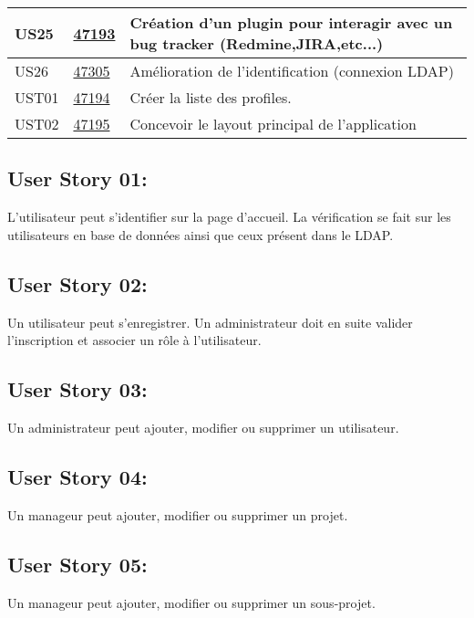 \begin{center}
\begin{tabular}{|l|p{1.5cm}|p{14cm}|}
        \hline
US25	&	\href{https://redmine-projets.smile.fr/issues/47193}{47193}	&	Création d'un plugin pour interagir avec un bug tracker (Redmine,JIRA,etc...)	                \\
        \hline
US26	&	\href{https://redmine-projets.smile.fr/issues/47305}{47305}	&	Amélioration de l'identification (connexion LDAP)	                                            \\
        \hline
UST01	&	\href{https://redmine-projets.smile.fr/issues/47194}{47194}	&	Créer la liste des profiles.	                                                                \\
        \hline
UST02	&	\href{https://redmine-projets.smile.fr/issues/47195}{47195}	&	Concevoir le layout principal de l'application	                                                \\
        \hline
    \end{tabular}
\end{center}


	

	\subsection{User Story 01:}
	L'utilisateur peut s'identifier sur la page d'accueil. La vérification se fait sur les utilisateurs en base de données ainsi que ceux
	présent dans le LDAP.
	

	\subsection{User Story 02:}
	Un utilisateur peut s'enregistrer. Un administrateur doit en suite valider l'inscription et associer un rôle à l'utilisateur.
	
	\subsection{User Story 03:}
	Un administrateur peut ajouter, modifier ou supprimer un utilisateur.
	
	\subsection{User Story 04:}
	Un manageur peut ajouter, modifier ou supprimer un projet.
	
	\subsection{User Story 05:}
	Un manageur peut ajouter, modifier ou supprimer un sous-projet.
	
